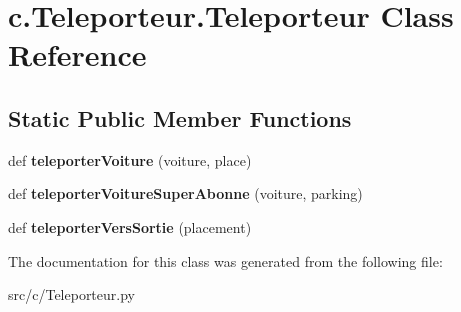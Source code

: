 \hypertarget{classc_1_1_teleporteur_1_1_teleporteur}{}\section{c.\+Teleporteur.\+Teleporteur Class Reference}
\label{classc_1_1_teleporteur_1_1_teleporteur}
\subsection*{Static Public Member Functions}
\begin{DoxyCompactItemize}
\item 
\hypertarget{classc_1_1_teleporteur_1_1_teleporteur_a2d271ba37bbd385f4b39483544cbbdde}{}def {\bfseries teleporter\+Voiture} (voiture, place)\label{classc_1_1_teleporteur_1_1_teleporteur_a2d271ba37bbd385f4b39483544cbbdde}

\item 
\hypertarget{classc_1_1_teleporteur_1_1_teleporteur_ab576fa8f00c6f623f60d8fac54687b32}{}def {\bfseries teleporter\+Voiture\+Super\+Abonne} (voiture, parking)\label{classc_1_1_teleporteur_1_1_teleporteur_ab576fa8f00c6f623f60d8fac54687b32}

\item 
\hypertarget{classc_1_1_teleporteur_1_1_teleporteur_a5e40513f58c68d2dd0d3337936c33775}{}def {\bfseries teleporter\+Vers\+Sortie} (placement)\label{classc_1_1_teleporteur_1_1_teleporteur_a5e40513f58c68d2dd0d3337936c33775}

\end{DoxyCompactItemize}


The documentation for this class was generated from the following file\+:\begin{DoxyCompactItemize}
\item 
src/c/Teleporteur.\+py\end{DoxyCompactItemize}
